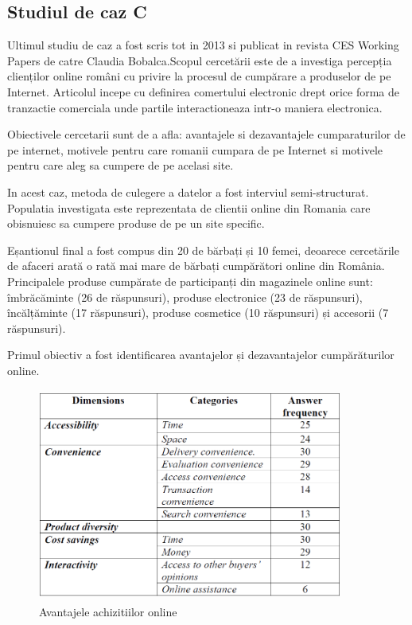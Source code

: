 \documentclass[a4paper, 12pt]{article}
\begin{document}
		\subsection{Studiul de caz C}
		\qquad Ultimul studiu de caz  a fost scris tot in 2013 si publicat in revista CES Working Papers de catre Claudia Bobalca.Scopul cercetării este de a investiga percepția clienților online români cu privire la procesul de cumpărare a produselor de pe Internet. Articolul incepe cu definirea comertului electronic drept orice forma de tranzactie comerciala unde partile interactioneaza intr-o maniera electronica.
		
		\quad Obiectivele cercetarii sunt de a afla: avantajele si dezavantajele cumparaturilor de pe internet, motivele pentru care romanii cumpara de pe Internet si motivele pentru care aleg sa cumpere de pe acelasi site.
		
		\quad In acest caz, metoda de culegere a datelor a fost interviul semi-structurat. Populatia investigata este reprezentata de clientii online din Romania care obisnuiesc sa cumpere produse de pe un site specific. 
		
		\quad Eșantionul final a fost compus din 20 de bărbați și 10 femei, deoarece cercetările de afaceri arată o rată mai mare de bărbați cumpărători online din România. Principalele produse cumpărate de participanți din magazinele online sunt: îmbrăcăminte (26 de răspunsuri), produse electronice (23 de răspunsuri), încălțăminte (17 răspunsuri), produse cosmetice (10 răspunsuri) și accesorii (7 răspunsuri).
		
		\quad Primul obiectiv a fost identificarea avantajelor și dezavantajelor cumpărăturilor online. 
		\begin{figure}[!htb]
			\centering
			\includegraphics[width=10cm, height=7cm]{"figures/zece.png"}
			\caption{Avantajele achizitiilor online}\label{fig:zece}
		\end{figure}
	
\end{document}
